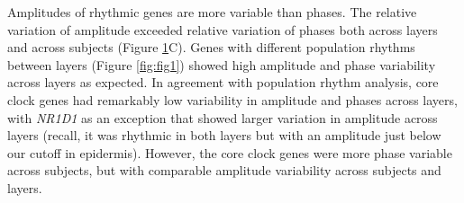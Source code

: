 \begin{figure}[t!]
\begin{center}
		\label{fig:fig2}
		
	\end{center}
\end{figure}
Amplitudes of rhythmic genes are more variable than phases. The relative variation of amplitude exceeded relative variation of phases both across layers and across subjects (Figure \ref{fig:fig2}C). Genes with different population rhythms between layers (Figure \ref{fig:fig1}) showed high amplitude and phase variability across layers as expected. In agreement with population rhythm analysis, core clock genes had remarkably low variability in amplitude and phases across layers, with \textit{NR1D1} as an exception that showed larger variation in amplitude across layers (recall, it was rhythmic in both layers but with an amplitude just below our cutoff in epidermis). However, the core clock genes were more phase variable across subjects, but with comparable amplitude variability across subjects and layers. %

